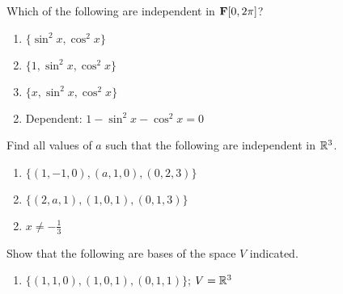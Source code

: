 \begin{multicols}{2}
\begin{ex}
\begin{sol}
\begin{enumerate}[label={\alph*.}]
\end{enumerate}
\end{sol}
\end{ex}

\begin{ex}
Which of the following are independent in $\textbf{F}[0, 2\pi]$?

\begin{enumerate}[label={\alph*.}]
\item $\{\sin^{2} x, \cos^{2} x\}$

\item $\{1, \sin^{2} x, \cos^{2} x\}$

\item $\{x, \sin^{2} x, \cos^{2} x\}$

\end{enumerate}
\begin{sol}
\begin{enumerate}[label={\alph*.}]
\setcounter{enumi}{1}
\item  Dependent: $1 - \sin^{2} x - \cos^{2} x = 0$

\end{enumerate}
\end{sol}
\end{ex}

\begin{ex}
Find all values of $a$ such that the following are independent in $\mathbb{R}^3$.

\begin{enumerate}[label={\alph*.}]
\item $\{(1, -1, 0), (a, 1, 0), (0, 2, 3)\}$

\item $\{(2, a, 1), (1, 0, 1), (0, 1, 3)\}$

\end{enumerate}
\begin{sol}
\begin{enumerate}[label={\alph*.}]
\setcounter{enumi}{1}
\item  $x \neq -\frac{1}{3}$

\end{enumerate}
\end{sol}
\end{ex}

\begin{ex}
Show that the following are bases of the space $V$ indicated.

\begin{enumerate}[label={\alph*.}]
\item $\{(1, 1, 0), (1, 0, 1), (0, 1, 1)\}$; $V = \mathbb{R}^3$


\end{enumerate}
\end{ex}
\end{multicols}

